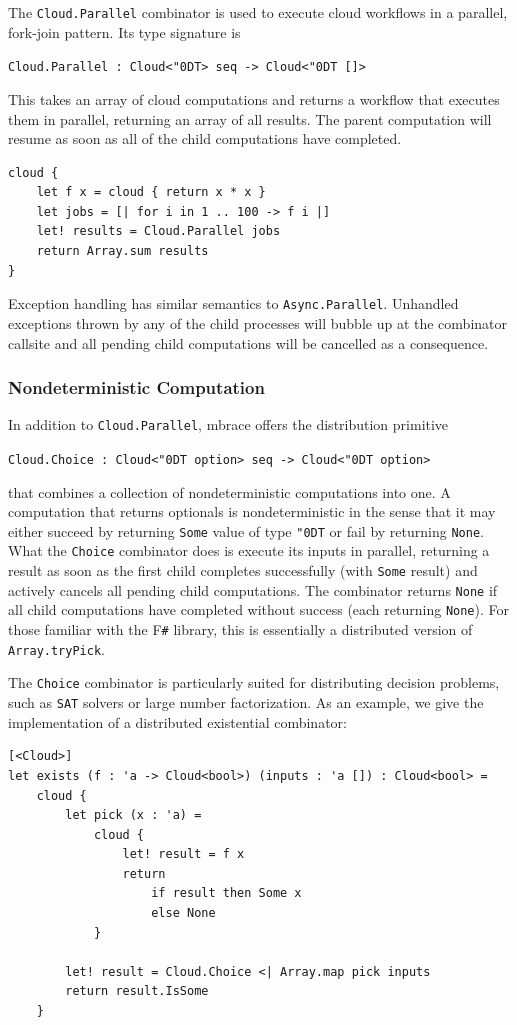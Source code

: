 \documentclass[9pt,a4paper]{article}
\newcommand{\mbrace}{mbrace}
\newcommand{\fsharp}{F\texttt \#}
\newcommand{\centertt}[1]{\begin{center}\texttt{#1}\end{center}}
\newcommand{\uq}{\char"0D}
\begin{document}
The \texttt{Cloud.Parallel} combinator is used to execute cloud workflows in a parallel, 
fork-join pattern. Its type signature is
\centertt{Cloud.Parallel : Cloud<\uq{}T> seq -> Cloud<\uq{}T []>}
This takes an array of cloud computations and returns a workflow that executes them
in parallel, returning an array of all results.
The parent computation will resume as soon as all of the child computations have completed.
\begin{lstlisting}
cloud {
    let f x = cloud { return x * x }
    let jobs = [| for i in 1 .. 100 -> f i |]   
    let! results = Cloud.Parallel jobs
    return Array.sum results
}
\end{lstlisting}
%
Exception handling has similar semantics to \texttt{Async.Parallel}.
Unhandled exceptions thrown by any of the child processes will
bubble up at the combinator callsite and all pending child computations
will be cancelled as a consequence.

\subsubsection*{Nondeterministic Computation}
%
In addition to \texttt{Cloud.Parallel}, \mbrace{} offers the distribution primitive
\centertt{Cloud.Choice : Cloud<\uq{}T option> seq -> Cloud<\uq{}T option> }
that combines a collection of nondeterministic computations into one.
A computation that returns optionals is nondeterministic in the sense that
it may either succeed by returning \texttt{Some} value of type \texttt{\uq{}T} or
fail by returning \texttt{None}.
What the \texttt{Choice} combinator does is execute its inputs in parallel,
returning a result as soon as the first child completes successfully 
(with \texttt{Some} result) and actively cancels all pending child computations.
The combinator returns \texttt{None} if all child computations have completed
without success (each returning \texttt{None}).
For those familiar with the \fsharp{} library, this is essentially a distributed
version of \texttt{Array.tryPick}.

The \texttt{Choice} combinator is particularly suited for distributing decision problems,
such as \texttt{SAT} solvers or large number factorization.
As an example, we give the implementation of a distributed existential combinator:
\begin{lstlisting}
[<Cloud>]
let exists (f : 'a -> Cloud<bool>) (inputs : 'a []) : Cloud<bool> =
    cloud {
        let pick (x : 'a) =
            cloud {
                let! result = f x
                return
                    if result then Some x
                    else None
            }

        let! result = Cloud.Choice <| Array.map pick inputs
        return result.IsSome 
    }
\end{lstlisting}
\end{document}
